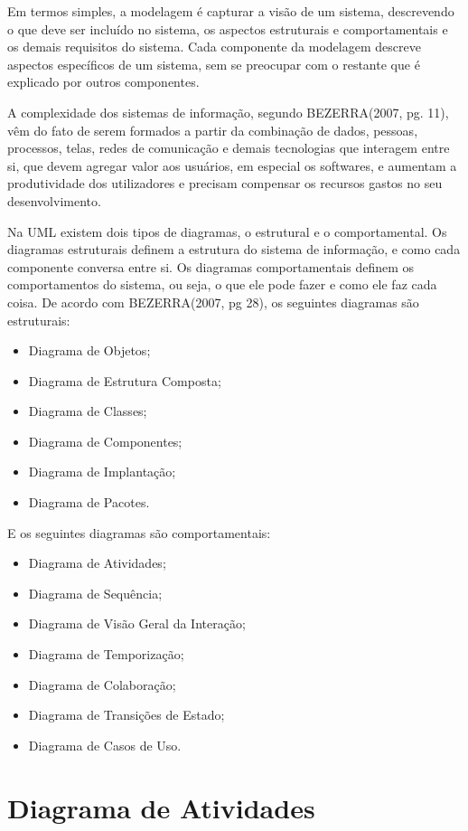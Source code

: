 \documentclass[12pt,openright,oneside,a4paper,
	chapter=TITLE,
	section=TITLE,
	english,brazil]{abntex2}
\begin{document}
Em termos simples, a modelagem é capturar a visão de um sistema, descrevendo o que deve ser incluído no sistema, os aspectos estruturais e comportamentais e os demais requisitos do sistema. Cada componente da modelagem descreve aspectos específicos de um sistema, sem se preocupar com o restante que é explicado por outros componentes.

A complexidade dos sistemas de informação, segundo BEZERRA(2007, pg. 11), vêm do fato de serem formados a partir da combinação de dados, pessoas, processos, telas, redes de comunicação e demais tecnologias que interagem entre si, que devem agregar valor aos usuários, em especial os softwares, e aumentam a produtividade dos utilizadores e precisam compensar os recursos gastos no seu desenvolvimento.

Na UML existem dois tipos de diagramas, o estrutural e o comportamental. Os diagramas estruturais definem a estrutura do sistema de informação, e como cada componente conversa entre si. Os diagramas comportamentais definem os comportamentos do sistema, ou seja, o que ele pode fazer e como ele faz cada coisa. De acordo com BEZERRA(2007, pg 28), os seguintes diagramas são estruturais:

\begin{itemize}
	\item Diagrama de Objetos;
	\item Diagrama de Estrutura Composta;
	\item Diagrama de Classes;
	\item Diagrama de Componentes;
	\item Diagrama de Implantação;
	\item Diagrama de Pacotes.
\end{itemize}

E os seguintes diagramas são comportamentais:

\begin{itemize}
	\item Diagrama de Atividades;
	\item Diagrama de Sequência;
	\item Diagrama de Visão Geral da Interação;
	\item Diagrama de Temporização;
	\item Diagrama de Colaboração;
	\item Diagrama de Transições de Estado;
	\item Diagrama de Casos de Uso.
\end{itemize}

\chapter{Diagrama de Atividades}
\end{document}
